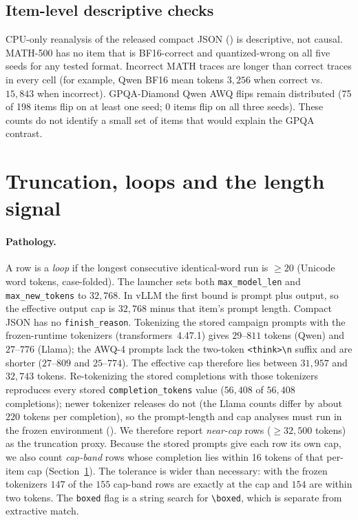 \documentclass[11pt,a4paper]{article}
\begin{document}
\subsection{Item-level descriptive checks}
CPU-only reanalysis of the released compact JSON () is descriptive, not causal. MATH-500 has no item that is BF16-correct and quantized-wrong on all five seeds for any tested format. Incorrect MATH traces are longer than correct traces in every cell (for example, Qwen BF16 mean tokens $3{,}256$ when correct vs.\ $15{,}843$ when incorrect). GPQA-Diamond Qwen AWQ flips remain distributed (75 of 198 items flip on at least one seed; 0 items flip on all three seeds). These counts do not identify a small set of items that would explain the GPQA contrast.

\FloatBarrier
\section{Truncation, loops and the length signal}
\label{sec:pathology}
\paragraph{Pathology.}
A row is a \emph{loop} if the longest consecutive identical-word run is $\ge 20$ (Unicode word tokens, case-folded). The launcher sets both \texttt{max\_model\_len} and \texttt{max\_new\_tokens} to $32{,}768$. In vLLM the first bound is prompt plus output, so the effective output cap is $32{,}768$ minus that item's prompt length. Compact JSON has no \texttt{finish\_reason}. Tokenizing the stored campaign prompts with the frozen-runtime tokenizers (transformers~4.47.1) gives $29$--$811$ tokens (Qwen) and $27$--$776$ (Llama); the AWQ-4 prompts lack the two-token \texttt{<think>\textbackslash n} suffix and are shorter ($27$--$809$ and $25$--$774$). The effective cap therefore lies between $31{,}957$ and $32{,}743$ tokens. Re-tokenizing the stored completions with those tokenizers reproduces every stored \texttt{completion\_tokens} value ($56{,}408$ of $56{,}408$ completions); newer tokenizer releases do not (the Llama counts differ by about $220$ tokens per completion), so the prompt-length and cap analyses must run in the frozen environment (). We therefore report \emph{near-cap} rows ($\ge 32{,}500$ tokens) as the truncation proxy. Because the stored prompts give each row its own cap, we also count \emph{cap-band} rows whose completion lies within 16 tokens of that per-item cap (Section~\ref{sec:pathology}). The tolerance is wider than necessary: with the frozen tokenizers $147$ of the $155$ cap-band rows are exactly at the cap and $154$ are within two tokens. The \texttt{boxed} flag is a string search for \texttt{\textbackslash boxed}, which is separate from extractive match.
\end{document}
